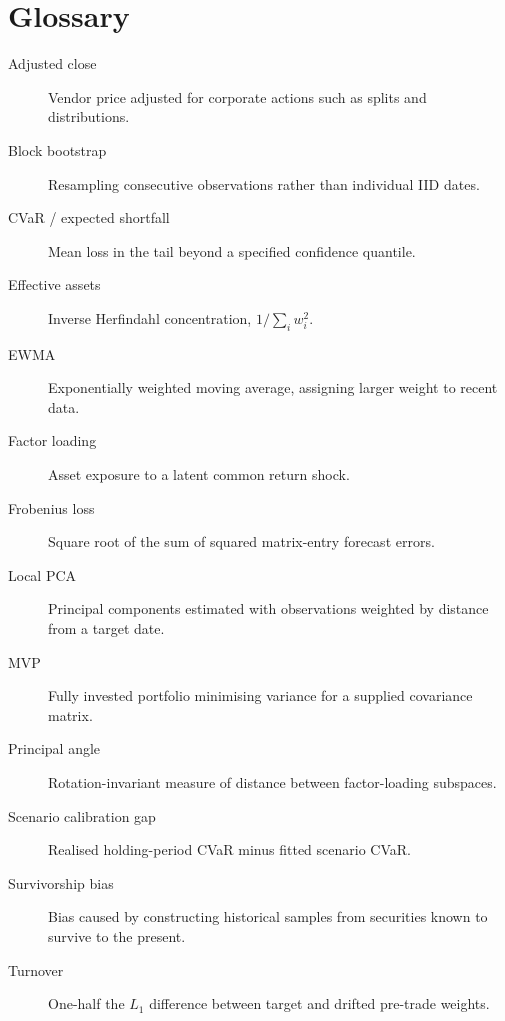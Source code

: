 \documentclass[11pt,a4paper]{article}
\begin{document}
\section{Glossary}

\begin{description}
  \item[Adjusted close] Vendor price adjusted for corporate actions such as splits and distributions.
  \item[Block bootstrap] Resampling consecutive observations rather than individual IID dates.
  \item[CVaR / expected shortfall] Mean loss in the tail beyond a specified confidence quantile.
  \item[Effective assets] Inverse Herfindahl concentration, $1/\sum_iw_i^2$.
  \item[EWMA] Exponentially weighted moving average, assigning larger weight to recent data.
  \item[Factor loading] Asset exposure to a latent common return shock.
  \item[Frobenius loss] Square root of the sum of squared matrix-entry forecast errors.
  \item[Local PCA] Principal components estimated with observations weighted by distance from a target date.
  \item[MVP] Fully invested portfolio minimising variance for a supplied covariance matrix.
  \item[Principal angle] Rotation-invariant measure of distance between factor-loading subspaces.
  \item[Scenario calibration gap] Realised holding-period CVaR minus fitted scenario CVaR.
  \item[Survivorship bias] Bias caused by constructing historical samples from securities known to survive to the present.
  \item[Turnover] One-half the $L_1$ difference between target and drifted pre-trade weights.
\end{description}
\end{document}
